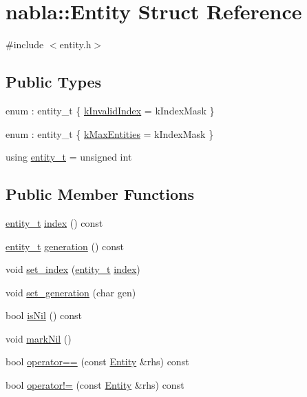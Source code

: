 \hypertarget{structnabla_1_1_entity}{}\section{nabla\+::Entity Struct Reference}
\label{structnabla_1_1_entity}


{\ttfamily \#include $<$entity.\+h$>$}

\subsection*{Public Types}
\begin{DoxyCompactItemize}
\item 
enum \+: entity\+\_\+t \{ \mbox{\hyperlink{structnabla_1_1_entity_af5d356291772b453f7788f76d3b6eda3a2dc217e059d1f8553805dfaae2db3051}{k\+Invalid\+Index}} = k\+Index\+Mask
 \}
\item 
enum \+: entity\+\_\+t \{ \mbox{\hyperlink{structnabla_1_1_entity_adaba9a30fd5fdebbe2a7f02ebe218bd2a1a033d53efd50a9e1848472cb1d0a6e6}{k\+Max\+Entities}} = k\+Index\+Mask
 \}
\item 
using \mbox{\hyperlink{structnabla_1_1_entity_a0e7d5826cda759dfeb3a81c8175f3b4d}{entity\+\_\+t}} = unsigned int
\end{DoxyCompactItemize}
\subsection*{Public Member Functions}
\begin{DoxyCompactItemize}
\item 
\mbox{\hyperlink{structnabla_1_1_entity_a0e7d5826cda759dfeb3a81c8175f3b4d}{entity\+\_\+t}} \mbox{\hyperlink{structnabla_1_1_entity_a4305d04861f997e061c98ff154d67063}{index}} () const
\item 
\mbox{\hyperlink{structnabla_1_1_entity_a0e7d5826cda759dfeb3a81c8175f3b4d}{entity\+\_\+t}} \mbox{\hyperlink{structnabla_1_1_entity_a5573713a19571f575b0245a8ed438172}{generation}} () const
\item 
void \mbox{\hyperlink{structnabla_1_1_entity_a853114bf954cd6fed1cff037edfe74a2}{set\+\_\+index}} (\mbox{\hyperlink{structnabla_1_1_entity_a0e7d5826cda759dfeb3a81c8175f3b4d}{entity\+\_\+t}} \mbox{\hyperlink{structnabla_1_1_entity_a4305d04861f997e061c98ff154d67063}{index}})
\item 
void \mbox{\hyperlink{structnabla_1_1_entity_ac93adb2a92a18f6f8a5d3ecf6844c317}{set\+\_\+generation}} (char gen)
\item 
bool \mbox{\hyperlink{structnabla_1_1_entity_ab121ebf82b7a9a60de85b4683454569f}{is\+Nil}} () const
\item 
void \mbox{\hyperlink{structnabla_1_1_entity_a089ff4e9a1f34c51bc9d472f2a47f33d}{mark\+Nil}} ()
\item 
bool \mbox{\hyperlink{structnabla_1_1_entity_a7c9daf8724739c429a2c22c7fa271a31}{operator==}} (const \mbox{\hyperlink{structnabla_1_1_entity}{Entity}} \&rhs) const
\item 
bool \mbox{\hyperlink{structnabla_1_1_entity_a4d68a63047a53435df7345276f397dda}{operator!=}} (const \mbox{\hyperlink{structnabla_1_1_entity}{Entity}} \&rhs) const
\end{DoxyCompactItemize}
